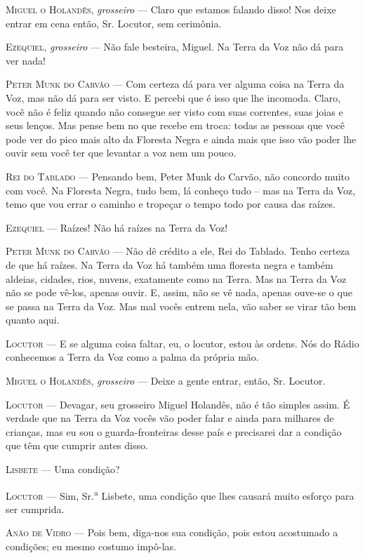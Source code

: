 \textsc{Miguel o Holandês}, \emph{grosseiro} --- Claro que estamos falando disso!
Nos deixe entrar em cena então, Sr. Locutor, sem cerimônia.

\textsc{Ezequiel}, \emph{grosseiro} --- Não fale besteira, Miguel. Na Terra da Voz
não dá para ver nada!

\textsc{Peter Munk do Carvão} --- Com certeza dá para ver alguma coisa na Terra da
Voz, mas não dá para ser visto. E percebi que é isso que lhe incomoda.
Claro, você não é feliz quando não consegue ser visto com suas
correntes, suas joias e seus lenços. Mas pense bem no que recebe em
troca: todas as pessoas que você pode ver do pico mais alto da Floresta
Negra e ainda mais que isso vão poder lhe ouvir sem você ter que
levantar a voz nem um pouco.

\textsc{Rei do Tablado} --- Pensando bem, Peter Munk do Carvão, não concordo muito
com você. Na Floresta Negra, tudo bem, lá conheço tudo -- mas na Terra
da Voz, temo que vou errar o caminho e tropeçar o tempo todo por causa
das raízes.

\textsc{Ezequiel} --- Raízes! Não há raízes na Terra da Voz!

\textsc{Peter Munk do Carvão} --- Não dê crédito a ele, Rei do Tablado. Tenho
certeza de que há raízes. Na Terra da Voz há também uma floresta negra e
também aldeias, cidades, rios, nuvens, exatamente como na Terra. Mas na
Terra da Voz não se pode vê-los, apenas ouvir. E, assim, não se vê nada,
apenas ouve-se o que se passa na Terra da Voz. Mas mal vocês entrem
nela, vão saber se virar tão bem quanto aqui.

\textsc{Locutor} --- E se alguma coisa faltar, eu, o locutor, estou às ordens. Nós
do Rádio conhecemos a Terra da Voz como a palma da própria mão.

\textsc{Miguel o Holandês}, \emph{grosseiro} --- Deixe a gente entrar, então, Sr.
Locutor.

\textsc{Locutor} --- Devagar, seu grosseiro Miguel Holandês, não é tão simples
assim. É verdade que na Terra da Voz vocês vão poder falar e ainda para
milhares de crianças, mas eu sou o guarda-fronteiras desse país e
precisarei dar a condição que têm que cumprir antes disso.

\textsc{Lisbete} --- Uma condição?

\textsc{Locutor} --- Sim, Sr.\textsuperscript{a} Lisbete, uma condição que lhes
causará muito esforço para ser cumprida.

\textsc{Anão de Vidro} --- Pois bem, diga-nos sua condição, pois estou acostumado
a condições; eu mesmo costumo impô-las.


